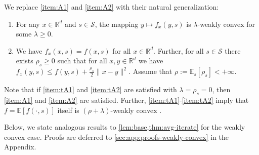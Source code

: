 \documentclass{article}
\newcommand{\R}{\mathbb{R}}
\newcommand{\E}{\mathbb{E}}
\theoremstyle{plain}
\theoremstyle{definition}
\theoremstyle{remark}
\begin{document}
We replace \ref{item:A1} and \ref{item:A2} with their natural generalization:
\begin{enumerate}[label=(\~{A}\arabic*)]
    \item\label{item:tA1} For any $x\in \R^d$ and $s\in \mathcal{S}$, the mapping $y\mapsto f_x(y,s)$ is $\lambda$-weakly convex for some $\lambda\geq 0$.
    \item\label{item:tA2} We have $f_x(x,s) = f(x,s)$ for all $x\in \R^d$. Further, for all $s\in \mathcal{S}$ there exists $\rho_s \geq 0$ such that for all $x,y\in \R^d$ we have $f_x(y,s) \leq f(y,s) + \frac{\rho_s}{2}\|x-y\|^2$. Assume that $\rho := \E_s[\rho_s] < +\infty $.
\end{enumerate}
%
Note that if \ref{item:tA1} and \ref{item:tA2} are satisfied with $\lambda=\rho_s=0$, then \ref{item:A1} and \ref{item:A2} are satisfied.
Further, \ref{item:tA1}-\ref{item:tA2} imply that $f=\E[f(\cdot,s)]$ itself is $(\rho+\lambda)$-weakly convex \citep[Lem.\ 4.1]{Davis2019}.


Below, we state analogous results to \cref{lem:base,thm:avg-iterate} for the weakly convex case. Proofs are deferred to \cref{sec:app:proofs-weakly-convex} in the Appendix.
\end{document}
